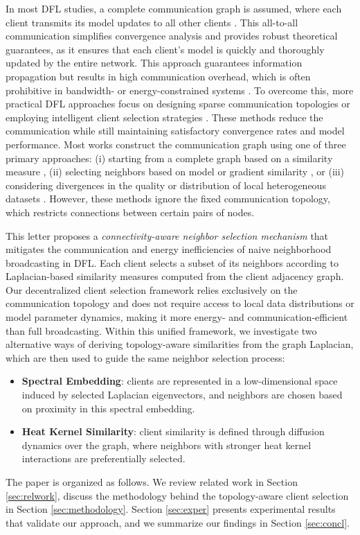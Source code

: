 \documentclass[journal]{IEEEtran}
\begin{document}
In most DFL studies, a complete communication graph is assumed, where each client transmits its model updates to all other clients \cite{DSGD, healthcare, decOPT, iot}. This all-to-all communication simplifies convergence analysis and provides robust theoretical guarantees, as it ensures that each client's model is quickly and thoroughly updated by the entire network. This approach guarantees information propagation but results in high communication overhead, which is often prohibitive in bandwidth- or energy-constrained systems \cite{decOPT}. To overcome this, more practical DFL approaches focus on designing sparse communication topologies or employing intelligent client selection strategies \cite{client_select_spl, graph_select1}. These methods reduce the communication while still maintaining satisfactory convergence rates and model performance. Most works construct the communication graph using one of three primary approaches: (i) starting from a complete graph based on a similarity measure \cite{smart_samp, select_data_2}, (ii) selecting neighbors based on model or gradient similarity \cite{select_grad_1}, or (iii) considering divergences in the quality or distribution of local heterogeneous datasets \cite{select_data_2}. However, these methods ignore the fixed communication topology, which restricts connections between certain pairs of nodes.

This letter proposes a \textit{connectivity-aware neighbor selection mechanism} that mitigates the communication and energy inefficiencies of naive neighborhood broadcasting in DFL. Each client selects a subset of its neighbors according to Laplacian-based similarity measures computed from the client adjacency graph. Our decentralized client selection framework relies exclusively on the communication topology and does not require access to local data distributions or model parameter dynamics, making it more energy- and communication-efficient than full broadcasting. Within this unified framework, we investigate two alternative ways of deriving topology-aware similarities from the graph Laplacian, which are then used to guide the same neighbor selection process:
\begin{itemize}
    \item \textbf{Spectral Embedding}: clients are represented in a low-dimensional space induced by selected Laplacian eigenvectors, and neighbors are chosen based on proximity in this spectral embedding.
    \item \textbf{Heat Kernel Similarity}: client similarity is defined through diffusion dynamics over the graph, where neighbors with stronger heat kernel interactions are preferentially selected.
\end{itemize}
The paper is organized as follows. We review related work in Section \ref{sec:relwork}, discuss the methodology behind the topology-aware client selection in Section \ref{sec:methodology}. Section \ref{sec:exper} presents experimental results that validate our approach, and we summarize our findings in Section \ref{sec:concl}.
\end{document}
